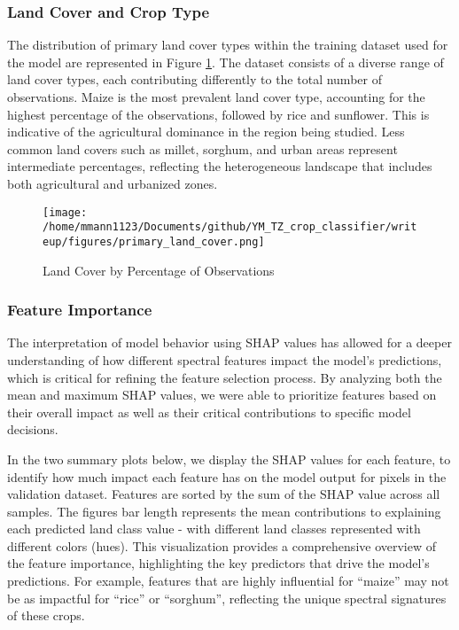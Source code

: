 \documentclass[
  journal,
  twocolumn]{IEEEtran}
\begin{document}
\hypertarget{land-cover-and-crop-type}{%
\subsubsection{Land Cover and Crop
Type}\label{land-cover-and-crop-type}}

The distribution of primary land cover types within the training dataset
used for the model are represented in Figure \ref{fig:lc_percentages}.
The dataset consists of a diverse range of land cover types, each
contributing differently to the total number of observations. Maize is
the most prevalent land cover type, accounting for the highest
percentage of the observations, followed by rice and sunflower. This is
indicative of the agricultural dominance in the region being studied.
Less common land covers such as millet, sorghum, and urban areas
represent intermediate percentages, reflecting the heterogeneous
landscape that includes both agricultural and urbanized zones.

\begin{figure}[H]
   \centering   \texttt{[image: /home/mmann1123/Documents/github/YM\_TZ\_crop\_classifier/writeup/figures/primary\_land\_cover.png]} %
   \caption{Land Cover by Percentage of Observations}
   \label{fig:lc_percentages} %
\end{figure}

\hypertarget{feature-importance}{%
\subsubsection{Feature Importance}\label{feature-importance}}

The interpretation of model behavior using SHAP values has allowed for a
deeper understanding of how different spectral features impact the
model's predictions, which is critical for refining the feature
selection process. By analyzing both the mean and maximum SHAP values,
we were able to prioritize features based on their overall impact as
well as their critical contributions to specific model decisions.

In the two summary plots below, we display the SHAP values for each
feature, to identify how much impact each feature has on the model
output for pixels in the validation dataset. Features are sorted by the
sum of the SHAP value across all samples. The figures bar length
represents the mean contributions to explaining each predicted land
class value - with different land classes represented with different
colors (hues). This visualization provides a comprehensive overview of
the feature importance, highlighting the key predictors that drive the
model's predictions. For example, features that are highly influential
for ``maize'' may not be as impactful for ``rice'' or ``sorghum'',
reflecting the unique spectral signatures of these crops.
\end{document}
